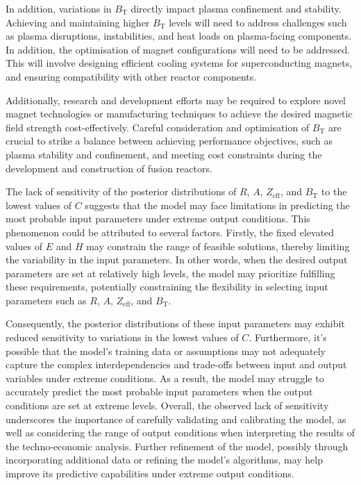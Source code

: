\documentclass[journal]{IEEEtran}
\begin{document}
In addition, variations in $B_{\text{T}}$ directly impact plasma confinement and stability. Achieving and maintaining higher $B_{\text{T}}$ levels will need to address challenges such as plasma disruptions, instabilities, and heat loads on plasma-facing components. In addition, the optimisation of magnet configurations will need to be addressed. This will involve designing efficient cooling systems for superconducting magnets, and ensuring compatibility with other reactor components. 

Additionally, research and development efforts may be required to explore novel magnet technologies or manufacturing techniques to achieve the desired magnetic field strength cost-effectively. Careful consideration and optimisation of $B_{\text{T}}$ are crucial to strike a balance between achieving performance objectives, such as plasma stability and confinement, and meeting cost constraints during the development and construction of fusion reactors.

The lack of sensitivity of the posterior distributions of $R$, $A$, $Z_{\text{eff}}$, and $B_{\text{T}}$ to the lowest values of $C$ suggests that the model may face limitations in predicting the most probable input parameters under extreme output conditions. This phenomenon could be attributed to several factors. Firstly, the fixed elevated values of $E$ and $H$ may constrain the range of feasible solutions, thereby limiting the variability in the input parameters. In other words, when the desired output parameters are set at relatively high levels, the model may prioritize fulfilling these requirements, potentially constraining the flexibility in selecting input parameters such as $R$, $A$, $Z_{\text{eff}}$, and $B_{\text{T}}$. 

Consequently, the posterior distributions of these input parameters may exhibit reduced sensitivity to variations in the lowest values of $C$. Furthermore, it's possible that the model's training data or assumptions may not adequately capture the complex interdependencies and trade-offs between input and output variables under extreme conditions. As a result, the model may struggle to accurately predict the most probable input parameters when the output conditions are set at extreme levels. Overall, the observed lack of sensitivity underscores the importance of carefully validating and calibrating the model, as well as considering the range of output conditions when interpreting the results of the techno-economic analysis. Further refinement of the model, possibly through incorporating additional data or refining the model's algorithms, may help improve its predictive capabilities under extreme output conditions.
\end{document}
